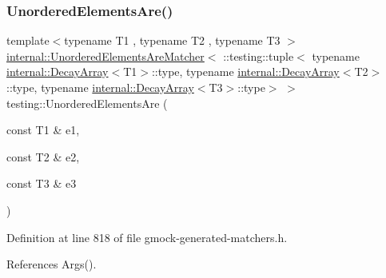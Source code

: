 \subsubsection{\texorpdfstring{Unordered\+Elements\+Are()}{UnorderedElementsAre()}\hspace{0.1cm}{\footnotesize\ttfamily [4/11]}}
{\footnotesize\ttfamily template$<$typename T1 , typename T2 , typename T3 $>$ \\
\hyperlink{classtesting_1_1internal_1_1UnorderedElementsAreMatcher}{internal\+::\+Unordered\+Elements\+Are\+Matcher}$<$ \+::testing\+::tuple$<$ typename \hyperlink{structtesting_1_1internal_1_1DecayArray}{internal\+::\+Decay\+Array}$<$T1$>$\+::type, typename \hyperlink{structtesting_1_1internal_1_1DecayArray}{internal\+::\+Decay\+Array}$<$T2$>$\+::type, typename \hyperlink{structtesting_1_1internal_1_1DecayArray}{internal\+::\+Decay\+Array}$<$T3$>$\+::type$>$ $>$ testing\+::\+Unordered\+Elements\+Are (\begin{DoxyParamCaption}\item[{const T1 \&}]{e1,  }\item[{const T2 \&}]{e2,  }\item[{const T3 \&}]{e3 }\end{DoxyParamCaption})\hspace{0.3cm}{\ttfamily [inline]}}



Definition at line 818 of file gmock-\/generated-\/matchers.\+h.



References Args().


